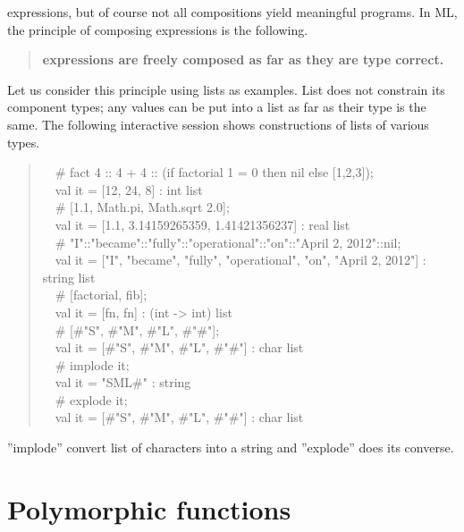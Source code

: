 \documentclass{jbook}
\newcommand{\txt}[2]{#2}
\newcommand{\myem}{\mbox{\ \ }}
\begin{document}
expressions, but of course not all compositions yield meaningful
programs.
	In ML, the principle of composing expressions is the following.
\begin{quote}
{\bf expressions are freely composed as far as they are type correct.}
\end{quote}
	Let us consider this principle using lists as examples.
	List does not constrain its component types; any values can be
put into a list as far as their type is the same.
	The following interactive session shows constructions of lists
of various types.
\begin{tt}
\begin{quote}
\myem \# fact 4 :: 4 + 4 :: (if factorial 1 = 0 then nil else [1,2,3]);
\\\myem  val it = [12, 24, 8] : int list
\\\myem   \# [1.1, Math.pi, Math.sqrt 2.0];
\\\myem   val it = [1.1, 3.14159265359, 1.41421356237] : real list
\\\myem   \# "I"::"became"::"fully"::"operational"::"on"::"April 2, 2012"::nil;
\\\myem   val it = ["I", "became", "fully", "operational", "on", "April 2, 2012"] : string list
\\\myem   \# [factorial, fib];
\\\myem   val it = [fn, fn] : (int  -> int) list
\\\myem   \# [\#"S", \#"M", \#"L", \#"\#"];
\\\myem   val it = [\#"S", \#"M", \#"L", \#"\#"] : char list
\\\myem   \# implode it;
\\\myem   val it = "SML\#" : string
\\\myem   \# explode it;
\\\myem   val it = [\#"S", \#"M", \#"L", \#"\#"] : char list
\end{quote}
\end{tt}
''implode'' convert list of characters into a string and ''explode''
does its converse.
\fi%

\section{\txt{多相型を持つ関数}{Polymorphic functions}}
\label{sec:tutorialPolymorphicfunction}
\end{document}
